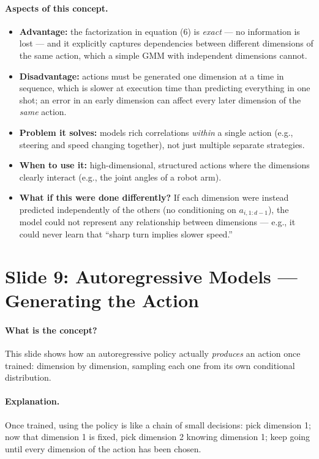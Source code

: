 \documentclass[11pt]{article}
\begin{document}
\paragraph{Aspects of this concept.}
\begin{itemize}
\item \textbf{Advantage:} the factorization in equation (6) is \emph{exact} --- no
information is lost --- and it explicitly captures dependencies between different
dimensions of the same action, which a simple GMM with independent dimensions cannot.
\item \textbf{Disadvantage:} actions must be generated one dimension at a time in
sequence, which is slower at execution time than predicting everything in one shot; an
error in an early dimension can affect every later dimension of the \emph{same} action.
\item \textbf{Problem it solves:} models rich correlations \emph{within} a single
action (e.g., steering and speed changing together), not just multiple separate
strategies.
\item \textbf{When to use it:} high-dimensional, structured actions where the
dimensions clearly interact (e.g., the joint angles of a robot arm).
\item \textbf{What if this were done differently?} If each dimension were instead
predicted independently of the others (no conditioning on $a_{i,1:d-1}$), the model
could not represent any relationship between dimensions --- e.g., it could never learn
that ``sharp turn implies slower speed.''
\end{itemize}

\section{Slide 9: Autoregressive Models --- Generating the Action}

\paragraph{What is the concept?}
This slide shows how an autoregressive policy actually \emph{produces} an action once
trained: dimension by dimension, sampling each one from its own conditional
distribution.

\paragraph{Explanation.}
Once trained, using the policy is like a chain of small decisions: pick dimension 1;
now that dimension 1 is fixed, pick dimension 2 knowing dimension 1; keep going until
every dimension of the action has been chosen.
\end{document}
